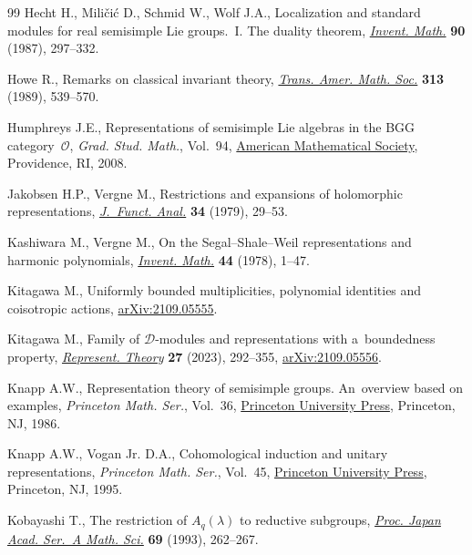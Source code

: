 \documentclass[pdftex]{sigma}
\numberwithin{equation}{section}
\theoremstyle{definition}
\begin{document}
\begin{thebibliography}{99}
Hecht H., Mili\v{c}i\'c D., Schmid W., Wolf J.A., Localization and standard
 modules for real semisimple {L}ie groups.~{I}. {T}he duality theorem,
 \href{https://doi.org/10.1007/BF01388707}{\textit{Invent. Math.}} \textbf{90}
 (1987), 297--332.

Howe R., Remarks on classical invariant theory,
 \href{https://doi.org/10.2307/2001418}{\textit{Trans. Amer. Math. Soc.}}
 \textbf{313} (1989), 539--570.

Humphreys J.E., Representations of semisimple {L}ie algebras in the {BGG}
 category~{$\mathcal{O}$}, \textit{Grad. Stud. Math.}, Vol.~94,
 \href{https://doi.org/10.1090/gsm/094}{American Mathematical Society},
 Providence, RI, 2008.

Jakobsen H.P., Vergne M., Restrictions and expansions of holomorphic
 representations,
 \href{https://doi.org/10.1016/0022-1236(79)90023-5}{\textit{J.~Funct. Anal.}}
 \textbf{34} (1979), 29--53.

Kashiwara M., Vergne M., On the {S}egal--{S}hale--{W}eil representations and
 harmonic polynomials,
 \href{https://doi.org/10.1007/BF01389900}{\textit{Invent. Math.}} \textbf{44}
 (1978), 1--47.

Kitagawa M., Uniformly bounded multiplicities, polynomial identities and
 coisotropic actions,
 \href{http://arxiv.org/abs/2109.05555}{arXiv:2109.05555}.

Kitagawa M., Family of {$\mathcal{D}$}-modules and representations with
 a~boundedness property,
 \href{https://doi.org/10.1090/ert/641}{\textit{Represent. Theory}}
 \textbf{27} (2023), 292--355,
 \href{http://arxiv.org/abs/2109.05556}{arXiv:2109.05556}.

Knapp A.W., Representation theory of semisimple groups. An~overview based on
 examples, \textit{Princeton Math. Ser.}, Vol.~36,
 \href{https://doi.org/10.1515/9781400883974}{Princeton University Press},
 Princeton, NJ, 1986.

Knapp A.W., Vogan Jr. D.A., Cohomological induction and unitary
 representations, \textit{Princeton Math. Ser.}, Vol.~45,
 \href{https://doi.org/10.1515/9781400883936}{Princeton University Press},
 Princeton, NJ, 1995.

Kobayashi T., The restriction of {$A_q(\lambda)$} to reductive subgroups,
 \href{https://doi.org/10.3792/pjaa.69.262}{\textit{Proc. Japan Acad. Ser.~A
 Math. Sci.}} \textbf{69} (1993), 262--267.


\end{thebibliography}
\end{document}
